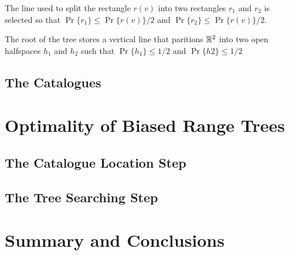 \documentclass[lotsofwhite,charterfonts]{patmorin}
\begin{document}
The line used to split the rectangle $r(v)$ into two rectangles $r_1$
and $r_2$ is selected so that $\Pr\{r_1\}\le \Pr\{r(v)\}/2$ and
$\Pr\{r_2\}\le \Pr\{r(v)\}/2$.

  The root of
the tree stores a vertical line that paritions $\mathbb{R}^2$ into two open
halfspaces $h_1$ and $h_2$ such that $\Pr\{h_1\}\le 1/2$ and
$\Pr\{h2\} \le 1/2$


\subsection{The Catalogues}

\section{Optimality of Biased Range Trees}

\subsection{The Catalogue Location Step}


\subsection{The Tree Searching Step}

\section{Summary and Conclusions}
\end{document}

